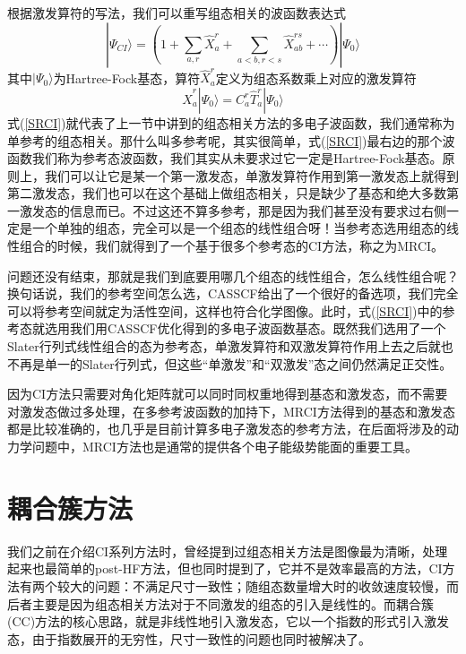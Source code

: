 \documentclass[12pt,a4paper,openany,twoside]{book}
\numberwithin{equation}{section}
\begin{document}
          根据激发算符的写法，我们可以重写组态相关的波函数表达式
          \begin{equation}
            | \Psi_{CI} \rangle = \left(1+\sum_{a,r}\hat{X}_{a}^{r}+\sum_{a<b,r<s}\hat{X}_{ab}^{rs}+\cdots\right) | \Psi_0 \rangle
            \label{SRCI}
          \end{equation}
          其中$ | \Psi_0 \rangle $为Hartree-Fock基态，算符$\hat{X}_{a}^{r}$定义为组态系数乘上对应的激发算符
          \begin{equation}
            \hat{X}_{a}^{r} | \Psi_0 \rangle = C_{a}^r \hat{T}_{a}^{r} | \Psi_0 \rangle
          \end{equation}
          式(\ref{SRCI})就代表了上一节中讲到的组态相关方法的多电子波函数，我们通常称为单参考的组态相关。那什么叫多参考呢，其实很简单，式(\ref{SRCI})最右边的那个波函数我们称为参考态波函数，我们其实从未要求过它一定是Hartree-Fock基态。原则上，我们可以让它是某一个第一激发态，单激发算符作用到第一激发态上就得到第二激发态，我们也可以在这个基础上做组态相关，只是缺少了基态和绝大多数第一激发态的信息而已。不过这还不算多参考，那是因为我们甚至没有要求过右侧一定是一个单独的组态，完全可以是一个组态的线性组合呀！当参考态选用组态的线性组合的时候，我们就得到了一个基于很多个参考态的CI方法，称之为MRCI。

          问题还没有结束，那就是我们到底要用哪几个组态的线性组合，怎么线性组合呢？换句话说，我们的参考空间怎么选，CASSCF给出了一个很好的备选项，我们完全可以将参考空间就定为活性空间，这样也符合化学图像。此时，式(\ref{SRCI})中的参考态就选用我们用CASSCF优化得到的多电子波函数基态。既然我们选用了一个Slater行列式线性组合的态为参考态，单激发算符和双激发算符作用上去之后就也不再是单一的Slater行列式，但这些“单激发”和“双激发”态之间仍然满足正交性。

          因为CI方法只需要对角化矩阵就可以同时同权重地得到基态和激发态，而不需要对激发态做过多处理，在多参考波函数的加持下，MRCI方法得到的基态和激发态都是比较准确的，也几乎是目前计算多电子激发态的参考方法，在后面将涉及的动力学问题中，MRCI方法也是通常的提供各个电子能级势能面的重要工具。
      \section{耦合簇方法}
        我们之前在介绍CI系列方法时，曾经提到过组态相关方法是图像最为清晰，处理起来也最简单的post-HF方法，但也同时提到了，它并不是效率最高的方法，CI方法有两个较大的问题：不满足尺寸一致性；随组态数量增大时的收敛速度较慢，而后者主要是因为组态相关方法对于不同激发的组态的引入是线性的。而耦合簇(CC)方法的核心思路，就是非线性地引入激发态，它以一个指数的形式引入激发态，由于指数展开的无穷性，尺寸一致性的问题也同时被解决了。
\end{document}
